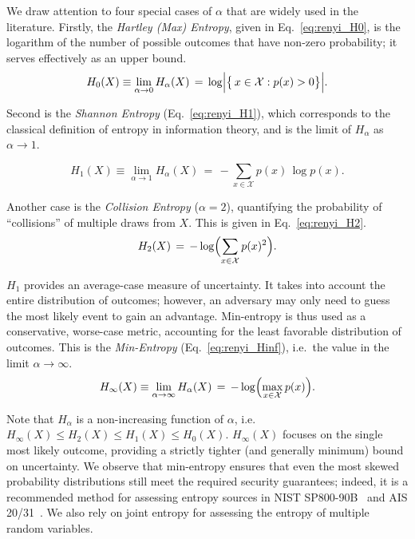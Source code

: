 We draw attention to four special cases of $\alpha$ that are widely used in the literature. Firstly, the \emph{Hartley (Max) Entropy}, given in Eq.~\ref{eq:renyi_H0}, is the  logarithm of the number of possible outcomes that have non-zero probability; it serves effectively as an upper bound.
\begin{equation}
H_{0}(X) \equiv \lim_{\alpha \to 0}H_\alpha(X)
\,=\, \log \Bigl|\bigl\{\,x \in \mathcal{X}: p(x) > 0 \bigr\}\Bigr|.
\label{eq:renyi_H0}
\end{equation}

Second is the \emph{Shannon Entropy} (Eq.~\ref{eq:renyi_H1}), which corresponds to the classical definition of entropy in information theory, and is the limit of \(H_{\alpha}\) as \(\alpha \to 1\).
 
\begin{equation}
H_{1}(X) \equiv \lim_{\alpha \to 1}H_\alpha(X)
\,=\, - \sum_{x \in \mathcal{X}} p(x)\,\log p(x).
\label{eq:renyi_H1}
\end{equation}

Another case is the \emph{Collision Entropy} (\(\alpha = 2\)), quantifying the probability of ``collisions'' of multiple draws from \(X\). This is given in Eq.~\ref{eq:renyi_H2}.
\begin{equation}
H_{2}(X)
\,=\, -\log \Bigl(\sum_{x \in \mathcal{X}} p(x)^{2}\Bigr).
\label{eq:renyi_H2}
\end{equation}

$H_1$ provides an average-case measure of uncertainty. It takes into account the entire distribution of outcomes; however, an adversary may only need to guess the most likely event to gain an advantage. Min-entropy is thus used as a conservative, worse-case metric, accounting for the least favorable distribution of outcomes. This is the  \emph{Min-Entropy} (Eq.~\ref{eq:renyi_Hinf}), i.e.\ the value in the limit \(\alpha \to \infty\).
\begin{equation}
H_{\infty}(X) \equiv \lim_{\alpha \to \infty}H_\alpha(X)
\,=\, -\log \Bigl(\max_{x \in \mathcal{X}} p(x)\Bigr).
\label{eq:renyi_Hinf}
\end{equation}

Note that $H_\alpha$ is a non-increasing function of $\alpha$, i.e.\ $H_{\infty}(X) \leq H_2 (X) \leq H_1(X)\leq H_0(X)$. $H_{\infty}(X)$ focuses on the single most likely outcome, providing a strictly tighter (and generally minimum) bound on uncertainty. We observe that min-entropy ensures that even the most skewed probability distributions still meet the required security guarantees; indeed, it is a recommended method for assessing entropy sources in NIST SP800-90B~\cite{turan2018recommendation} and AIS 20/31~\cite{bsi2024ais31}. We also rely on joint entropy for assessing the entropy of multiple random variables.

